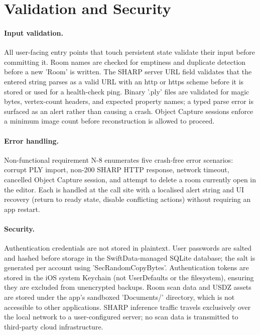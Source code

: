 
\section{Validation and Security}
\label{sec:validation_security}

\paragraph{Input validation.} All user-facing entry points that touch persistent state validate their input before committing it. Room names are checked for emptiness and duplicate detection before a new 'Room' is written. The SHARP server URL field validates that the entered string parses as a valid URL with an http or https scheme before it is stored or used for a health-check ping. Binary '.ply' files are validated for magic bytes, vertex-count headers, and expected property names; a typed parse error is surfaced as an alert rather than causing a crash. Object Capture sessions enforce a minimum image count before reconstruction is allowed to proceed.

\paragraph{Error handling.} Non-functional requirement N-8 enumerates five crash-free error scenarios: corrupt PLY import, non-200 SHARP HTTP response, network timeout, cancelled Object Capture session, and attempt to delete a room currently open in the editor. Each is handled at the call site with a localised alert string and UI recovery (return to ready state, disable conflicting actions) without requiring an app restart.

\paragraph{Security.} Authentication credentials are not stored in plaintext. User passwords are salted and hashed before storage in the SwiftData-managed SQLite database; the salt is generated per account using 'SecRandomCopyBytes'. Authentication tokens are stored in the iOS system Keychain (not UserDefaults or the filesystem), ensuring they are excluded from unencrypted backups. Room scan data and USDZ assets are stored under the app's sandboxed 'Documents/' directory, which is not accessible to other applications. SHARP inference traffic travels exclusively over the local network to a user-configured server; no scan data is transmitted to third-party cloud infrastructure.

